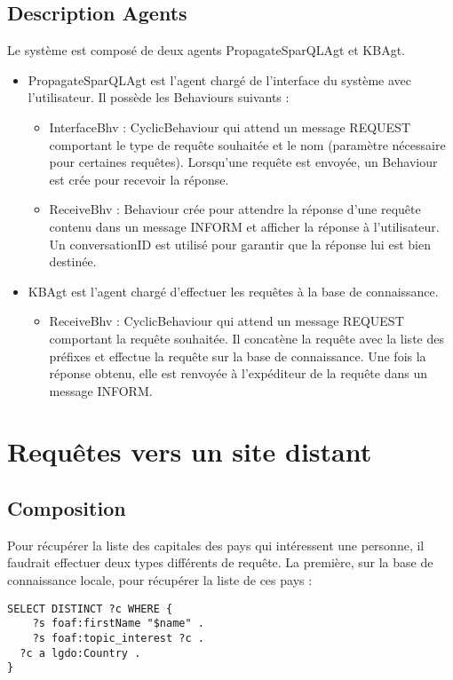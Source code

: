 \documentclass[a4paper,11pt]{article}
\begin{document}
\subsection{Description Agents}
Le système est composé de deux agents PropagateSparQLAgt et KBAgt.
\begin{itemize}
\item PropagateSparQLAgt est l'agent chargé de l'interface du système avec l'utilisateur. Il possède les Behaviours suivants :
	\begin{itemize}
		\item InterfaceBhv : CyclicBehaviour qui attend un message REQUEST comportant le type de requête souhaitée et le nom (paramètre nécessaire pour certaines requêtes). Lorsqu'une requête est envoyée, un Behaviour est crée pour recevoir la réponse.
		\item ReceiveBhv : Behaviour crée pour attendre la réponse d'une requête contenu dans un message INFORM et afficher la réponse à l'utilisateur. Un conversationID est utilisé pour garantir que la réponse lui est bien destinée.
	\end{itemize}
\item KBAgt est l'agent chargé d'effectuer les requêtes à la base de connaissance.
	\begin{itemize}
		\item ReceiveBhv : CyclicBehaviour qui attend un message REQUEST comportant la requête souhaitée. Il concatène la requête avec la liste des préfixes et effectue la requête sur la base de connaissance. Une fois la réponse obtenu, elle est renvoyée à l'expéditeur de la requête dans un message INFORM.
	\end{itemize}
\end{itemize}

\section{Requêtes vers un site distant}
\subsection{Composition}
Pour récupérer la liste des capitales des pays qui intéressent une personne, il faudrait effectuer deux types différents de requête.
La première, sur la base de connaissance locale, pour récupérer la liste de ces pays :
\begin{lstlisting}[language=SPARQL]
SELECT DISTINCT ?c WHERE {
	?s foaf:firstName "$name" .
	?s foaf:topic_interest ?c .
  ?c a lgdo:Country .
}
\end{lstlisting}
\end{document}
